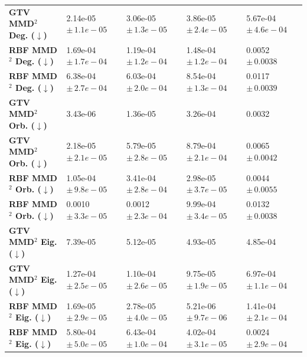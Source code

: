 {\begin{tabular}{lllll}
\textbf{GTV MMD$^2$ Deg. ($\downarrow$)} & 2.14e-05 $\pm\,\scriptstyle{1.1e-05}$ & 3.06e-05 $\pm\,\scriptstyle{1.3e-05}$ & 3.86e-05 $\pm\,\scriptstyle{2.4e-05}$ & 5.67e-04 $\pm\,\scriptstyle{4.6e-04}$\\
\textbf{RBF MMD$^2$ Deg. ($\downarrow$)} & 1.69e-04 $\pm\,\scriptstyle{1.7e-04}$ & 1.19e-04 $\pm\,\scriptstyle{1.2e-04}$ & 1.48e-04 $\pm\,\scriptstyle{1.2e-04}$ & 0.0052 $\pm\,\scriptstyle{0.0038}$\\
\textbf{RBF MMD$^2$ Deg. ($\downarrow$)} & 6.38e-04 $\pm\,\scriptstyle{2.7e-04}$ & 6.03e-04 $\pm\,\scriptstyle{2.0e-04}$ & 8.54e-04 $\pm\,\scriptstyle{1.3e-04}$ & 0.0117 $\pm\,\scriptstyle{0.0039}$\\
\textbf{GTV MMD$^2$ Orb. ($\downarrow$)} & 3.43e-06 & 1.36e-05 & 3.26e-04 & 0.0032\\
\textbf{GTV MMD$^2$ Orb. ($\downarrow$)} & 2.18e-05 $\pm\,\scriptstyle{2.1e-05}$ & 5.79e-05 $\pm\,\scriptstyle{2.8e-05}$ & 8.79e-04 $\pm\,\scriptstyle{2.1e-04}$ & 0.0065 $\pm\,\scriptstyle{0.0042}$\\
\textbf{RBF MMD$^2$ Orb. ($\downarrow$)} & 1.05e-04 $\pm\,\scriptstyle{9.8e-05}$ & 3.41e-04 $\pm\,\scriptstyle{2.8e-04}$ & 2.98e-05 $\pm\,\scriptstyle{3.7e-05}$ & 0.0044 $\pm\,\scriptstyle{0.0055}$\\
\textbf{RBF MMD$^2$ Orb. ($\downarrow$)} & 0.0010 $\pm\,\scriptstyle{3.3e-05}$ & 0.0012 $\pm\,\scriptstyle{2.3e-04}$ & 9.99e-04 $\pm\,\scriptstyle{3.4e-05}$ & 0.0132 $\pm\,\scriptstyle{0.0038}$\\
\textbf{GTV MMD$^2$ Eig. ($\downarrow$)} & 7.39e-05 & 5.12e-05 & 4.93e-05 & 4.85e-04\\
\textbf{GTV MMD$^2$ Eig. ($\downarrow$)} & 1.27e-04 $\pm\,\scriptstyle{2.5e-05}$ & 1.10e-04 $\pm\,\scriptstyle{2.6e-05}$ & 9.75e-05 $\pm\,\scriptstyle{1.9e-05}$ & 6.97e-04 $\pm\,\scriptstyle{1.1e-04}$\\
\textbf{RBF MMD$^2$ Eig. ($\downarrow$)} & 1.69e-05 $\pm\,\scriptstyle{2.9e-05}$ & 2.78e-05 $\pm\,\scriptstyle{4.0e-05}$ & 5.21e-06 $\pm\,\scriptstyle{9.7e-06}$ & 1.41e-04 $\pm\,\scriptstyle{2.1e-04}$\\
\textbf{RBF MMD$^2$ Eig. ($\downarrow$)} & 5.80e-04 $\pm\,\scriptstyle{5.0e-05}$ & 6.43e-04 $\pm\,\scriptstyle{1.0e-04}$ & 4.02e-04 $\pm\,\scriptstyle{3.1e-05}$ & 0.0024 $\pm\,\scriptstyle{2.9e-04}$\\
\bottomrule
\bottomrule
\end{tabular}}

